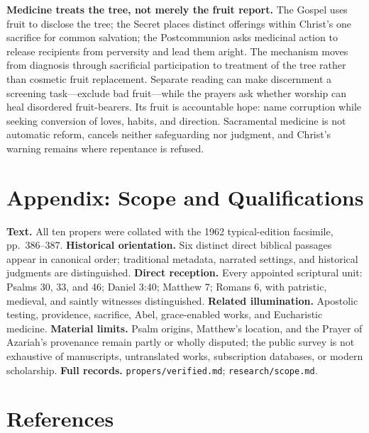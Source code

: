 \begin{deepstudy}
\noindent\textbf{Medicine treats the tree, not merely the fruit report.\enspace{}}
The Gospel uses fruit to disclose the tree; the Secret places distinct offerings within Christ's one sacrifice for common salvation; the Postcommunion asks medicinal action to release recipients from perversity and lead them aright. The mechanism moves from diagnosis through sacrificial participation to treatment of the tree rather than cosmetic fruit replacement. Separate reading can make discernment a screening task---exclude bad fruit---while the prayers ask whether worship can heal disordered fruit-bearers. Its fruit is accountable hope: name corruption while seeking conversion of loves, habits, and direction. Sacramental medicine is not automatic reform, cancels neither safeguarding nor judgment, and Christ's warning remains where repentance is refused.

\clearpage

\section*{Appendix: Scope and Qualifications}

\begin{studyframe}
\textbf{Text.} All ten propers were collated with the 1962 typical-edition facsimile, pp.~386--387. \textbf{Historical orientation.} Six distinct direct biblical passages appear in canonical order; traditional metadata, narrated settings, and historical judgments are distinguished. \textbf{Direct reception.} Every appointed scriptural unit: Psalms 30, 33, and 46; Daniel 3:40; Matthew 7; Romans 6, with patristic, medieval, and saintly witnesses distinguished. \textbf{Related illumination.} Apostolic testing, providence, sacrifice, Abel, grace-enabled works, and Eucharistic medicine. \textbf{Material limits.} Psalm origins, Matthew's location, and the Prayer of Azariah's provenance remain partly or wholly disputed; the public survey is not exhaustive of manuscripts, untranslated works, subscription databases, or modern scholarship. \textbf{Full records.} \nolinkurl{propers/verified.md}; \nolinkurl{research/scope.md}.
\end{studyframe}

\section*{References}


\end{deepstudy}
